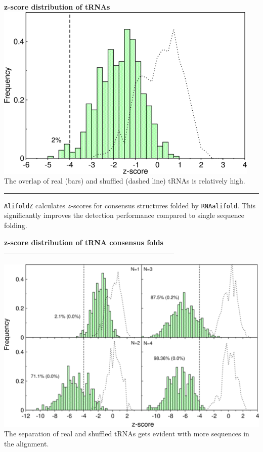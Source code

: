 \documentclass[]{article}
\begin{document}
\textbf{z-score distribution of tRNAs}\\

\includegraphics{Figs/trna-histo.png}\\
 The overlap of real (bars) and shuffled (dashed line) tRNAs is relatively
high.

\begin{center}\rule{0.5\linewidth}{\linethickness}\end{center}

\texttt{AlifoldZ} calculates \(z\)-scores for consensus structures
folded by \texttt{RNAalifold}. This significantly improves the detection
performance compared to single sequence folding.

\textbf{z-score distribution of tRNA consensus folds}\\

------------------------------------------------------------------------

\includegraphics{Figs/histos.png}\\
 The separation of real and shuffled tRNAs gets evident with more
sequences in the alignment.
\end{document}
